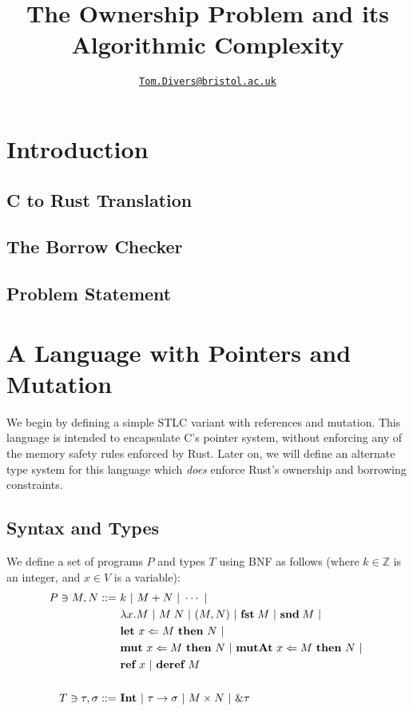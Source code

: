 \documentclass{article}
\title{The Ownership Problem and its Algorithmic Complexity}
\author{\href{mailto:oi24939@bristol.ac.uk}{\texttt{Tom.Divers@bristol.ac.uk}}}
\date{}
\newcommand{\agap}{\hspace{0.25em}}
\newcommand{\mkref}{\textbf{ref}~}
\newcommand{\deref}{\textbf{deref}~}%
\newcommand{\mutate}[3]{\textbf{mut}~ #1 \Leftarrow #2 ~\textbf{then}~ #3}
\newcommand{\mutptr}[3]{\textbf{mutAt}~ #1 \Leftarrow #2 ~\textbf{then}~ #3}
\newcommand{\letvar}[3]{\textbf{let}~ #1 \Leftarrow #2 ~\textbf{then}~ #3}
\begin{document}
\maketitle

\section{Introduction}

\subsection{C to Rust Translation}

\cite{zhang2023crown}

\subsection{The Borrow Checker}

\subsection{Problem Statement}

\section{A Language with Pointers and Mutation}

We begin by defining a simple STLC variant with references and mutation. This language is intended to encapsulate C's pointer system, without enforcing any of the memory safety rules enforced by Rust. Later on, we will define an alternate type system for this language which \textit{does} enforce Rust's ownership and borrowing constraints.


\subsection{Syntax and Types}

We define a set of programs $P$ and types $T$ using BNF as follows (where $k \in \mathbb{Z}$ is an integer, and $x \in V$ is a variable):
\begin{align*}
    P \ni M, N ::=~ &k ~|~ M + N ~|~ \cdots ~|~\\ 
    &\lambda x . M ~|~ M \agap N ~|~ (M, N) ~|~ \textbf{fst}\agap M ~|~ \textbf{snd}\agap M ~|~\\
    &\letvar{x}{M}{N} ~|~\\ 
    &\mutate{x}{M}{N} ~|~ \mutptr{x}{M}{N} ~|~\\
    &\mkref x ~|~ \deref M\\    
    ~\\
    T \ni \tau, \sigma ::=~ &\textbf{Int} ~|~ \tau \rightarrow \sigma ~|~ M \times N ~|~ \& \tau
\end{align*}
\end{document}
